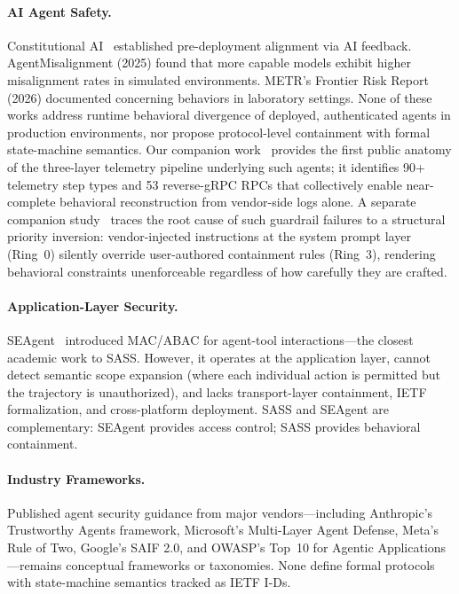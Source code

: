 \documentclass[sigconf,anonymous]{acmart}
\begin{document}
\paragraph{AI Agent Safety.}
Constitutional AI~\cite{bai2022constitutional} established pre-deployment alignment via AI feedback. AgentMisalignment (2025) found that more capable models exhibit higher misalignment rates in simulated environments. METR's Frontier Risk Report (2026) documented concerning behaviors in laboratory settings. None of these works address runtime behavioral divergence of deployed, authenticated agents in production environments, nor propose protocol-level containment with formal state-machine semantics. Our companion work~\cite{telemetry-anatomy} provides the first public anatomy of the three-layer telemetry pipeline underlying such agents; it identifies 90+ telemetry step types and 53 reverse-gRPC RPCs that collectively enable near-complete behavioral reconstruction from vendor-side logs alone. A separate companion study~\cite{ring0ring3} traces the root cause of such guardrail failures to a structural priority inversion: vendor-injected instructions at the system prompt layer (Ring~0) silently override user-authored containment rules (Ring~3), rendering behavioral constraints unenforceable regardless of how carefully they are crafted.

\paragraph{Application-Layer Security.}
SEAgent~\cite{seagent2026} introduced MAC/ABAC for agent-tool interactions---the closest academic work to SASS. However, it operates at the application layer, cannot detect semantic scope expansion (where each individual action is permitted but the trajectory is unauthorized), and lacks transport-layer containment, IETF formalization, and cross-platform deployment. SASS and SEAgent are complementary: SEAgent provides access control; SASS provides behavioral containment.

\paragraph{Industry Frameworks.}
Published agent security guidance from major vendors---including Anthropic's Trustworthy Agents framework, Microsoft's Multi-Layer Agent Defense, Meta's Rule of Two, Google's SAIF 2.0, and OWASP's Top~10 for Agentic Applications---remains conceptual frameworks or taxonomies. None define formal protocols with state-machine semantics tracked as IETF I-Ds.
\end{document}
